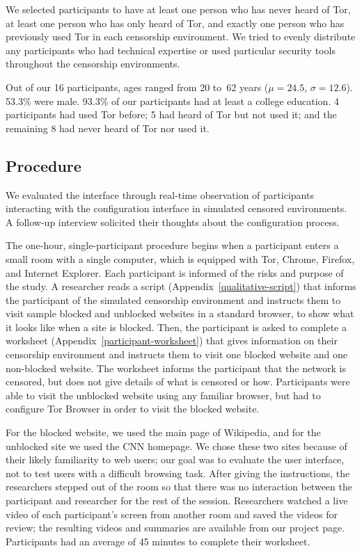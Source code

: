 \documentclass[USenglish,oneside,twocolumn]{article}
\begin{document}
We selected participants to have
at least one person who has never heard of Tor, at least one person who has 
only heard of Tor, and exactly one person who has previously used Tor in each
censorship
environment. We tried to evenly distribute any participants who had technical
expertise or used particular security tools throughout the censorship environments. 

Out of our 16 participants, ages ranged from 20 to~62 years
($\mu = 24.5$, $\sigma = 12.6$). 53.3\% were male. 
93.3\% of our participants had at least
a college education.
4 participants had used Tor before;
5 had heard of Tor but not used it;
and the remaining 8 had never heard of Tor nor used it.


\subsection{Procedure}
We evaluated the interface through real-time observation of 
participants interacting with the configuration interface in simulated censored environments.
A follow-up interview 
solicited their thoughts about the configuration process.

The one-hour, single-participant procedure begins when a participant enters a small 
room with a single computer, which is equipped with Tor, Chrome, Firefox, and Internet Explorer.
Each participant is informed of 
the risks and purpose of the study.
A researcher reads a script (Appendix~\ref{qualitative-script}) that 
informs the participant of the simulated censorship environment and
instructs them to visit sample blocked and unblocked websites
in a standard browser, to show what it looks like when a site is blocked.
Then, the participant is asked to 
complete a worksheet (Appendix~\ref{participant-worksheet}) that gives information
on their censorship environment and instructs them
to visit one blocked website and one non-blocked website.
The worksheet informs the participant that the network is censored,
but does not give details of what is censored or how.
Participants were able to visit the unblocked website using any familiar browser,
but had to configure Tor Browser in order to visit the blocked website.
 
For the blocked website, we used the main page of Wikipedia,
and for the unblocked site we used the CNN homepage.
We chose these two sites because of their likely familiarity to web users;
our goal was to evaluate the user interface,
not to test users with a difficult browsing task.
After giving the instructions,
the researchers stepped out of the room so that there was no interaction
between the participant and researcher for the rest of the session.
Researchers watched a live video of each participant's screen from another room
and saved the videos for review; the resulting videos and summaries
are available from our project page.
Participants had an 
average of 45 minutes to complete their worksheet. 
\end{document}

